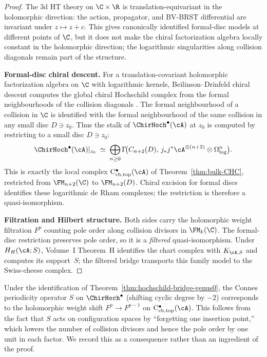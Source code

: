 \begin{proof}
The 3d HT theory on \(\C\times\R\) is translation-equivariant in the
holomorphic direction: the action, propagator, and BV-BRST
differential are invariant under \(z\mapsto z+c\). This gives
canonically identified formal-disc models at different points of
\(\C\), but it does not make the chiral factorization algebra locally
constant in the holomorphic direction; the logarithmic singularities
along collision diagonals remain part of the structure.

\textbf{Formal-disc chiral descent.}
For a translation-covariant holomorphic factorization algebra on
\(\C\) with logarithmic kernels, Beilinson--Drinfeld chiral descent
computes the global chiral Hochschild complex from the formal
neighbourhoods of the collision diagonals \cite[Ch.~3]{BD04}. The
formal neighbourhood of
a collision in \(\C\) is identified with the formal neighbourhood of the
same collision in any small disc \(D\ni z_0\). Thus the stalk of
$\ChirHoch^\bullet(\cA)$ at $z_0$ is computed by restricting to a
small disc $D \ni z_0$:
\[
\ChirHoch^\bullet(\cA)|_{z_0}
\;\simeq\;
\bigoplus_{n \geq 0}
 \Gamma\!\bigl(
 C_{n+2}(D),\,
 j_\ast j^\ast \cA^{\otimes(n+2)}
 \otimes \Omega^n_{\log}
 \bigr).
\]
This is exactly the local complex
$\mathrm{C}^\bullet_{\mathrm{ch,top}}(\cA)$ of
Theorem~\ref{thm:bulk-CHC}, restricted from $\FM_{n+2}(\C)$ to
$\FM_{n+2}(D)$. Chiral excision for formal discs identifies these
logarithmic de Rham complexes; the restriction is therefore a
quasi-isomorphism.

\textbf{Filtration and Hilbert structure.}
Both sides carry the holomorphic weight filtration $F^p$ counting
pole order along collision divisors in $\FM_k(\C)$. The
formal-disc restriction preserves pole order, so it is a
\emph{filtered} quasi-isomorphism.  Under $H_H(\cA;S)$, Volume~I
Theorem~H identifies the chart complex with $K_{\cA,S}$ and computes
its support~$S$; the filtered bridge transports this family model to
the Swiss-cheese complex.
\end{proof}

\begin{remark}
Under the identification of
Theorem~\ref{thm:hochschild-bridge-genus0}, the Connes periodicity
operator $S$ on $\ChirHoch^\bullet$ (shifting cyclic degree by
$-2$) corresponds to the holomorphic weight shift
$F^p \to F^{p-1}$ on
$\mathrm{C}^\bullet_{\mathrm{ch,top}}(\cA)$. This follows from
the fact that $S$ acts on configuration spaces by ``forgetting one
insertion point,'' which lowers the number of collision divisors
and hence the pole order by one unit in each factor. We record
this as a consequence rather than an ingredient of the proof.
\end{remark}

